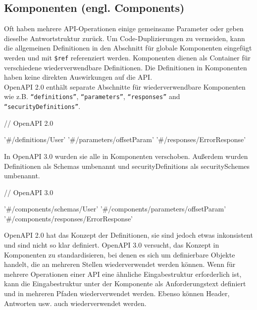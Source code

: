 \subsection{Komponenten (engl. Components)}

Oft haben mehrere API-Operationen einige gemeinsame Parameter oder geben dieselbe Antwortstruktur zurück. Um Code-Duplizierungen zu vermeiden, kann die allgemeinen Definitionen in den Abschnitt für globale Komponenten eingefügt werden und mit \texttt{\$ref} referenziert werden. Komponenten dienen als Container für verschiedene wiederverwendbare Definitionen. Die Definitionen in Komponenten haben keine direkten Auswirkungen auf die API\cite{openapicomponents17}.\\

OpenAPI 2.0 enthält separate Abschnitte für wiederverwendbare Komponenten wie z.B. \texttt{"`definitions"'}, \texttt{"`parameters"'}, \texttt{"`responses"'} and \texttt{"`securityDefinitions"'}.\\

\begin{LaTeXCode}[caption={Open API 2.0 - Komponenten\cite{openapicomponents17}},captionpos=b, label=LaTeXCode:openapi3.0-2][numbers=none]
// OpenAPI 2.0    

'#/definitions/User'
'#/parameters/offsetParam'
'#/responses/ErrorResponse'
\end{LaTeXCode}

In OpenAPI 3.0 wurden sie alle in Komponenten verschoben. Außerdem wurden Definitionen als Schemas umbenannt und securityDefinitions als securitySchemes umbenannt.\\

\begin{LaTeXCode}[caption={Open API 3.0 - Komponenten\cite{openapicomponents17}},captionpos=b, label=LaTeXCode:openapi3.0-3][numbers=none]
// OpenAPI 3.0

'#/components/schemas/User'
'#/components/parameters/offsetParam'
'#/components/responses/ErrorResponse'
\end{LaTeXCode}

OpenAPI 2.0 hat das Konzept der Definitionen, sie sind jedoch etwas inkonsistent und sind nicht so klar definiert. OpenAPI 3.0 versucht, das Konzept in Komponenten zu standardisieren, bei denen es sich um definierbare Objekte handelt, die an mehreren Stellen wiederverwendet werden können. Wenn für mehrere Operationen einer API eine ähnliche Eingabestruktur erforderlich ist, kann die Eingabestruktur unter der Komponente als Anforderungstext definiert und in mehreren Pfaden wiederverwendet werden. Ebenso können Header, Antworten usw. auch wiederverwendet werden.\\

